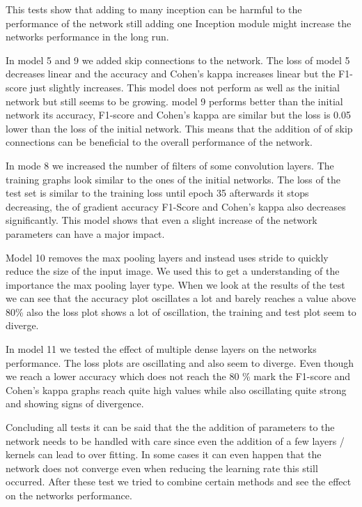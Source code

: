 \documentclass[
a4paper, 
12pt,
grayscalebody, %
abstract=on,
twoside, BCOR10mm, 12pt, DIV13,headinclude, footexclude, final, abstracton, openright
]{ibireprt}
\numberwithin{equation}{chapter}
\numberwithin{table}{chapter}
\numberwithin{figure}{chapter}
\numberwithin{algorithm}{chapter}
\numberwithin{example}{chapter}
\numberwithin{example}{chapter}
\begin{document}
This tests show that adding to many inception can be harmful to the performance of the network still adding one Inception module might increase the networks performance in the long run. 

In model 5 and 9 we added skip connections to the network. The loss of model 5 decreases linear and the accuracy and Cohen's kappa increases linear but the F1-score just slightly increases. This model does not perform as well as the initial network but still seems to be growing. model 9 performs better than the initial network its accuracy, F1-score and Cohen's kappa are similar but the loss is 0.05 lower than the loss of the initial network. 
This means that the addition of of skip connections can be beneficial to the overall performance of the network.

In mode 8 we increased the number of filters of some convolution layers. The training graphs look similar to the ones of the initial networks. The loss of the test set is similar to the training loss until epoch 35 afterwards it stops decreasing, the of gradient  accuracy F1-Score and Cohen's kappa also decreases significantly. This model shows that even a slight increase of the network parameters can have a major impact.

Model 10 removes the max pooling layers and instead uses stride to quickly reduce the size of the input image. We used this to get a understanding of the importance the max pooling layer type. When we look at the results of the test we can see that the accuracy plot oscillates a lot and barely reaches a value above 80\% also the loss plot shows a lot of oscillation, the training and test plot seem to diverge.

In model 11 we tested the effect of multiple dense layers on the networks performance. The loss plots are oscillating and also seem to diverge. Even though we reach a lower accuracy which does not reach the 80 \% mark the F1-score and Cohen's kappa graphs reach quite high values while also oscillating quite strong and showing signs of divergence.

Concluding all tests it can be said that the the addition of parameters to the network needs to be handled with care since even the addition of a few layers / kernels  can lead to over fitting. In some cases it can even happen that the network does not converge even when reducing the learning rate this still occurred.
After these test we tried to combine certain methods and see the effect on the networks performance. 
\end{document}
